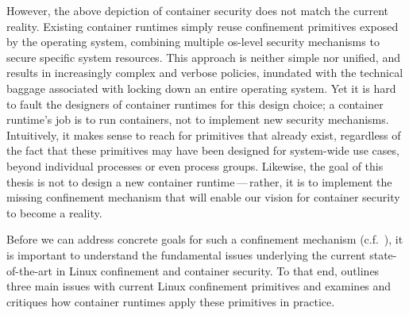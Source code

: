However, the above depiction of container security does not match the current reality.
Existing container runtimes simply reuse confinement primitives exposed by the operating
system, combining multiple \gls{os}-level security mechanisms to secure specific system
resources.  This approach is neither simple nor unified, and results in increasingly
complex and verbose policies, inundated with the technical baggage associated with locking
down an entire operating system. Yet it is hard to fault the designers of container
runtimes for this design choice; a container runtime's job is to run containers, not to
implement new security mechanisms. Intuitively, it makes sense to reach for primitives
that already exist, regardless of the fact that these primitives may have been designed
for system-wide use cases, beyond individual processes or even process groups. Likewise,
the goal of this thesis is not to design a new container runtime\,---\,rather, it is to
implement the missing confinement mechanism that will enable our vision for container
security to become a reality.

Before we can address concrete goals for such a confinement mechanism
(c.f.\ ), it is important to understand the fundamental
issues underlying the current state-of-the-art in Linux confinement and container
security. To that end,  outlines three main issues with current Linux
confinement primitives and  examines and critiques how container
runtimes apply these primitives in practice.



